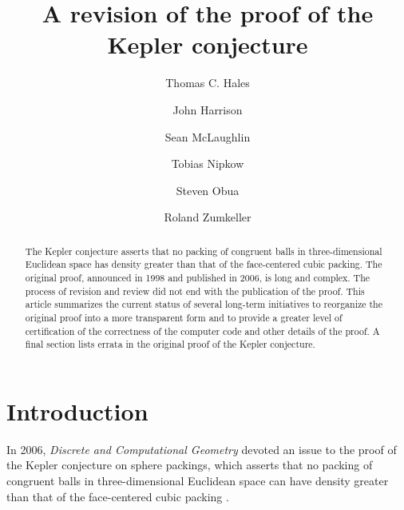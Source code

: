 \documentclass[11pt]{amsart}
\begin{document}
\title{A revision of the proof of the Kepler conjecture}

\author[Hales]{Thomas C. Hales}
\address[T.~Hales]{Math Department, University of Pittsburgh}

\author[Harrison]{John Harrison}
\address[J.~Harrison]{Intel Corporation,  JF1-13, 2111 NE 25th Avenue
 Hillsboro, OR 97124
 USA}

\author[McLaughlin]{Sean McLaughlin}
\address[S.~McLaughlin]{Carnegie Mellon University}

\author[Nipkow]{Tobias Nipkow}
\address[T.~Nipkow]{Department for Informatics, Technische Universit\"at
M\"unchen}

\author[Obua]{Steven Obua}
\address[S.~Obua]{Department for Informatics, Technische Universit\"at
M\"unchen}

\author[Zumkeller]{Roland Zumkeller}
\address[R.~Zumkeller]{\'Ecole Polytechnique, Paris}

\begin{abstract}
The Kepler conjecture asserts that no packing of congruent balls in three-dimensional Euclidean space 
has density greater than that of the face-centered cubic packing.  The original proof,
announced in 1998 and published in 2006, is long and complex. The process of  revision and review did not end with the publication of the proof.
This article summarizes the current status of several long-term initiatives to
reorganize the original proof into a more transparent form and to provide a greater
level of certification of the correctness of the computer code and other details of the proof.
A final section lists errata in the original proof of the Kepler conjecture.
\end{abstract}


\maketitle

\section{Introduction}

In 2006, {\it Discrete and Computational Geometry} devoted an issue to the
proof of the Kepler conjecture on sphere packings, which asserts that no
packing of congruent balls in three-dimensional Euclidean space can
have density greater than that of the face-centered cubic packing \cite{Hales:2006:DCG}.
\end{document}
